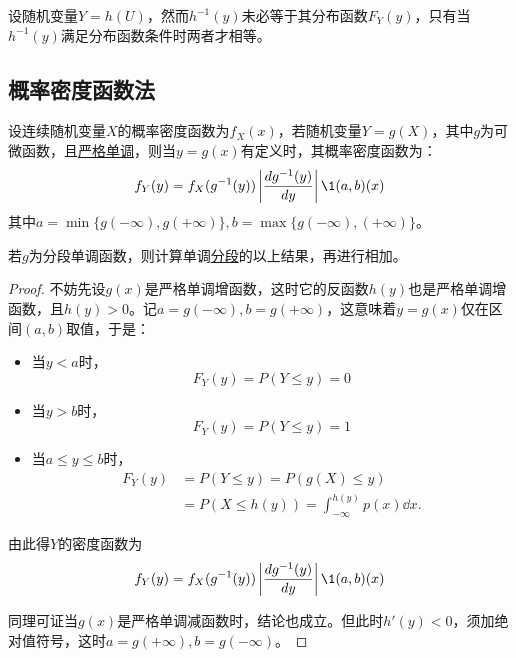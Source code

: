 \begin{remark}
    设随机变量$Y=h(U)$，然而$h^{-1}(y)$未必等于其分布函数$F_Y(y)$，只有当$h^{-1}(y)$满足分布函数条件时两者才相等。
\end{remark}


\subsection{概率密度函数法}

\begin{theorem}[单变量函数的概率函数变换]
    设连续随机变量$X$的概率密度函数为$f_X(x)$，若随机变量$Y=g(X)$，其中$g$为可微函数，且\underline{严格单调}，则当$y=g(x)$有定义时，其概率密度函数为：
    \[ f_Y(y)=f_X(g^{-1}(y))\left| \frac{dg^{-1}(y)}{dy} \right| \1{(a,b)}(x) \]
    其中$a=\min\{g(-\infty),g(+\infty)\},b=\max\{g(-\infty),(+\infty)\}$。

    若$g$为分段单调函数，则计算单调\underline{分段}的以上结果，再进行相加。
\end{theorem}
\begin{proof}
    不妨先设$g(x)$是严格单调增函数，这时它的反函数$h(y)$也是严格单调增函数，且$h(y)>0$。记$a=g(-\infty),b=g(+\infty)$，这意味着$y=g(x)$仅在区间$(a,b)$取值，于是：
    \begin{itemize}
        \item 当$y<a$时，
              \[ F_Y(y) = P(Y\le y) = 0 \]
        \item 当$y>b$时，
              \[ F_Y(y) = P(Y\le y) = 1 \]
        \item 当$a\le y\le b$时，
              \begin{align*}
                  F_Y(y) & = P(Y \le y) = P( g(X) \le y )                      \\
                         & = P(X \le h(y)) = \int_{-\infty}^{h(y)} p(x) \dd x.
              \end{align*}
    \end{itemize}
    由此得$Y$的密度函数为
    \[ f_Y(y)=f_X(g^{-1}(y))\left| \frac{dg^{-1}(y)}{dy} \right| \1{(a,b)}(x) \]

    同理可证当$g(x)$是严格单调减函数时，结论也成立。但此时$h'(y)<0$，须加绝对值符号，这时$a=g(+\infty),b=g(-\infty)$。
\end{proof}

